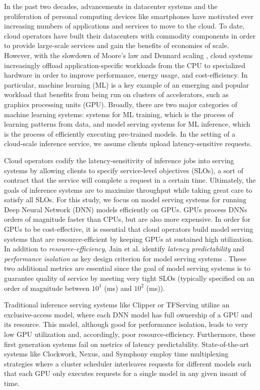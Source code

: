 In the past two decades, advancements in datacenter systems and the proliferation of personal computing devices like smartphones have motivated ever increasing numbers of applications and services to move to the cloud. 
To date, cloud operators have built their datacenters with commodity components in order to provide large-scale services and gain the benefits of economies of scale. However, with the slowdown of Moore’s law and Dennard scaling \cite{barroso}, cloud systems increasingly offload application-specific workloads from the CPU to specialized hardware in order to improve performance, energy usage, and cost-efficiency.
In particular, machine learning (ML) is a key example of an emerging and popular workload that benefits from being run on clusters of accelerators, such as graphics processing units (GPU). Broadly, there are two major categories of machine learning systems: systems for ML training, which is the process of learning patterns from data, and model serving systems for ML inference, which is the process of efficiently executing pre-trained models. In the setting of a cloud-scale inference service, we assume clients upload latency-sensitive requests.

Cloud operators codify the latency-sensitivity of inference jobs into serving systems by allowing clients to specify service-level objectives (SLOs), a sort of contract that the service will complete a request in a certain time. Ultimately, the goals of inference systems are to maximize throughput while taking great care to satisfy all SLOs.
For this study, we focus on model serving systems for running Deep Neural Network (DNN) models efficiently on GPUs. GPUs process DNNs orders of magnitude faster than CPUs, but are also more expensive. In order for GPUs to be cost-effective, it is essential that cloud operators build model serving systems that are {resource-efficient} by keeping GPUs at sustained high utilization. In addition to \emph{resource-efficiency}, Jain et al. identify \emph{latency predictability} and \emph{performance isolation} as key design criterion for model serving systems \cite{DBLP:journals/corr/abs-1901-00041}. These two additional metrics are essential since the goal of model serving systems is to guarantee quality of service by meeting very tight SLOs (typically specified on an order of magnitude between $10^1$ (ms) and $10^2$ (ms)). 

Traditional inference serving systems like Clipper \cite{Clipper} or TFServing \cite{TFServing} utilize an exclusive-access model, where each DNN model has full ownership of a GPU and its resource. This model, although good for performance isolation, leads to very low GPU utilization and, accordingly, poor resource-efficiency. 
Furthermore, these first generation systems fail on metrics of latency predictability. State-of-the-art systems like Clockwork, Nexus, and Symphony \cite{clockwork,nexus,symphony} employ time multiplexing strategies where a cluster scheduler interleaves requests for different models such that each GPU only executes requests for a single model in any given insant of time. 


